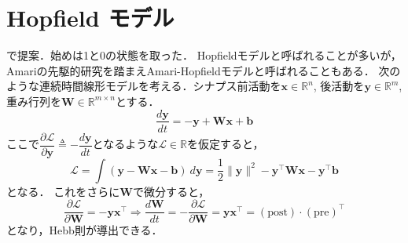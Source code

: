 \section{Hopfield モデル}
\citep{Hopfield1982-vu}で提案．始めは1と0の状態を取った．
Hopfieldモデルと呼ばれることが多いが，Amariの先駆的研究\citep{Amari1972-fq}を踏まえAmari-Hopfieldモデルと呼ばれることもある．
次のような連続時間線形モデルを考える．シナプス前活動を$\mathbf{x}\in \mathbb{R}^n$, 後活動を$\mathbf{y}\in \mathbb{R}^m$, 重み行列を$\mathbf{W}\in \mathbb{R}^{m\times n}$とする．
\begin{equation}
\frac{d\mathbf{y}}{dt}=-\mathbf{y}+\mathbf{W}\mathbf{x}+\mathbf{b}
\end{equation}
ここで$\dfrac{\partial\mathcal{L}}{\partial\mathbf{y}}\triangleq-\dfrac{d\mathbf{y}}{dt}$となるような$\mathcal{L}\in \mathbb{R}$を仮定すると，
\begin{equation}
\mathcal{L}=\int \left(\mathbf{y}-\mathbf{W}\mathbf{x}-\mathbf{b}\right)\ d\mathbf{y}=\frac{1}{2}\|\mathbf{y}\|^2-\mathbf{y}^\top \mathbf{W}\mathbf{x}-\mathbf{y}^\top \mathbf{b}
\end{equation}
となる． これをさらに$\mathbf{W}$で微分すると，
\begin{equation}
\dfrac{\partial\mathcal{L}}{\partial\mathbf{W}}=-\mathbf{y}\mathbf{x}^\top\Rightarrow
\frac{d\mathbf{W}}{dt}=-\dfrac{\partial\mathcal{L}}{\partial\mathbf{W}}=\mathbf{y}\mathbf{x}^\top=(\text{post})\cdot (\text{pre})^\top
\end{equation}
となり，Hebb則が導出できる．
